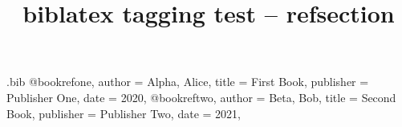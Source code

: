 \begin{filecontents*}[overwrite]{\jobname.bib}
	@book{refone,
		author    = {Alpha, Alice},
		title     = {First Book},
		publisher = {Publisher One},
		date      = {2020},
	}
	@book{reftwo,
		author    = {Beta, Bob},
		title     = {Second Book},
		publisher = {Publisher Two},
		date      = {2021},
	}
\end{filecontents*}
\documentclass{report}

\usepackage[backend=biber, style=authoryear, refsection=chapter]{biblatex}


\title{biblatex tagging test -- refsection}


	
	\chapter{One}
	*** REFSECTION AFTER CHAPTER ONE = \therefsection  %
	
	\cite{refone}
	
	\printbibliography[heading=subbibintoc,title={References}]
	
	\chapter{Two}
	*** REFSECTION AFTER CHAPTER TWO = \therefsection *** %
	
	\cite{reftwo}
	
	\printbibliography[heading=subbibintoc,title={References}]
	

